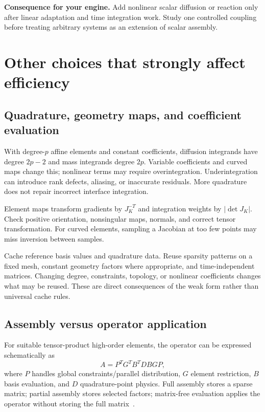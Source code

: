 \documentclass[11pt,a4paper]{article}
\newcommand{\abs}[1]{\left\lvert #1\right\rvert}
\newcommand{\decision}[1]{\par\smallskip\noindent\textcolor{accent}{\textbf{Consequence for your engine.}} #1\par}
\begin{document}
\decision{Add nonlinear scalar diffusion or reaction only after linear adaptation and time integration work. Study one controlled coupling before treating arbitrary systems as an extension of scalar assembly.}

\section{Other choices that strongly affect efficiency}\label{sec:performance}
\subsection{Quadrature, geometry maps, and coefficient evaluation}
With degree-$p$ affine elements and constant coefficients, diffusion integrands have degree $2p-2$ and mass integrands degree $2p$. Variable coefficients and curved maps change this; nonlinear terms may require overintegration. Underintegration can introduce rank defects, aliasing, or inaccurate residuals. More quadrature does not repair incorrect interface integration.

Element maps transform gradients by $J_K^{-T}$ and integration weights by $\abs{\det J_K}$. Check positive orientation, nonsingular maps, normals, and correct tensor transformation. For curved elements, sampling a Jacobian at too few points may miss inversion between samples.

Cache reference basis values and quadrature data. Reuse sparsity patterns on a fixed mesh, constant geometry factors where appropriate, and time-independent matrices. Changing degree, constraints, topology, or nonlinear coefficients changes what may be reused. These are direct consequences of the weak form rather than universal cache rules.

\subsection{Assembly versus operator application}
For suitable tensor-product high-order elements, the operator can be expressed schematically as
\begin{equation}
A=P^TG^TB^TDBG P,
\end{equation}
where $P$ handles global constraints/parallel distribution, $G$ element restriction, $B$ basis evaluation, and $D$ quadrature-point physics. Full assembly stores a sparse matrix; partial assembly stores selected factors; matrix-free evaluation applies the operator without storing the full matrix~\cite{mfem}.
\end{document}
